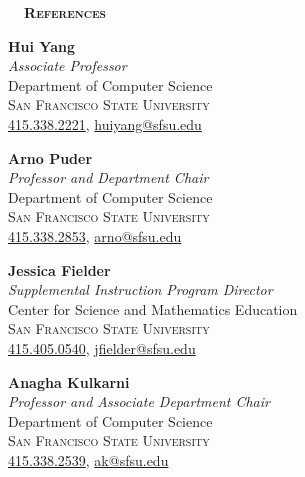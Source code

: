 \documentclass[hidelinks, 10.5pt]{article}
\def\contentwidth{0.9\linewidth}    %
\def\sectionspacing{8mm}            %
\def\sectiontocontentspacing{4mm}   %
\renewcommand{\section}[1]{
    {\fontsize{14}{14}\selectfont \textsc{\textbf{\ \ #1\ \ }}}\hrulefill
}
\begin{document}
{\vspace{\sectionspacing}


\section{References}

\vspace{\sectiontocontentspacing}

\begin{minipage}[ct]{\contentwidth}
    \begin{multicols}{2}
        \textbf{Hui Yang}\\
        \emph{Associate Professor}\\
        {Department of Computer Science}\\
        \textsc{San Francisco State University}\\
        \href{tel:4153382221}{415.338.2221}, \href{mailto:huiyang@sfsu.edu}{huiyang@sfsu.edu}\\

        \vspace{-1mm}

        \textbf{Arno Puder}\\
        \emph{Professor and Department Chair}\\
        {Department of Computer Science}\\
        \textsc{San Francisco State University}\\
        \href{tel:4153382853}{415.338.2853}, \href{mailto:arno@sfsu.edu}{arno@sfsu.edu}\\

        \vspace{-1mm}

        \textbf{Jessica Fielder}\\
        \emph{Supplemental Instruction Program Director}\\
        {Center for Science and Mathematics Education}\\
        \textsc{San Francisco State University}\\
        \href{tel:4154050540}{415.405.0540}, \href{mailto:jfielder@sfsu.edu}{jfielder@sfsu.edu}\\

        \columnbreak

        \textbf{Anagha Kulkarni}\\
        \emph{Professor and Associate Department Chair}\\
        {Department of Computer Science}\\
        \textsc{San Francisco State University}\\
        \href{tel:4153382539}{415.338.2539}, \href{mailto:ak@sfsu.edu}{ak@sfsu.edu}\\


\end{multicols}
\end{minipage}}
\end{document}
